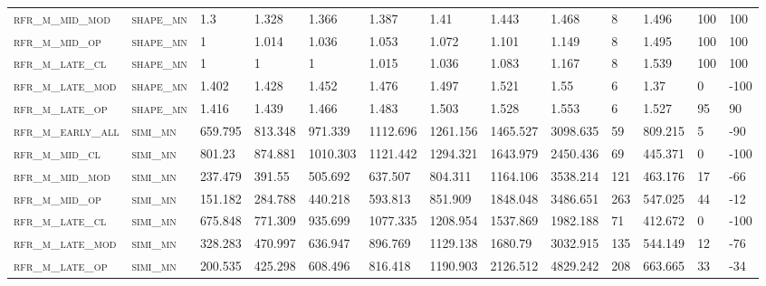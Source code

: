 \begin{landscape}
\begin{center}
\begin{footnotesize}
\begin{longtable}{lllllllllllll}
\textsc{rfr\_m\_mid\_mod  } & \textsc{shape\_mn }   & 1.3     & 1.328   & 1.366    & 1.387    & 1.41     & 1.443    & 1.468    & 8      & 1.496         & 100           & 100      \\
\textsc{rfr\_m\_mid\_op   } & \textsc{shape\_mn }   & 1       & 1.014   & 1.036    & 1.053    & 1.072    & 1.101    & 1.149    & 8      & 1.495         & 100           & 100      \\
\textsc{rfr\_m\_late\_cl  } & \textsc{shape\_mn }   & 1       & 1       & 1        & 1.015    & 1.036    & 1.083    & 1.167    & 8      & 1.539         & 100           & 100      \\
\textsc{rfr\_m\_late\_mod } & \textsc{shape\_mn }   & 1.402   & 1.428   & 1.452    & 1.476    & 1.497    & 1.521    & 1.55     & 6      & 1.37          & 0             & -100     \\
\textsc{rfr\_m\_late\_op  } & \textsc{shape\_mn }   & 1.416   & 1.439   & 1.466    & 1.483    & 1.503    & 1.528    & 1.553    & 6      & 1.527         & 95            & 90       \\
\textsc{rfr\_m\_early\_all} & \textsc{simi\_mn  }   & 659.795 & 813.348 & 971.339  & 1112.696 & 1261.156 & 1465.527 & 3098.635 & 59     & 809.215       & 5             & -90      \\
\textsc{rfr\_m\_mid\_cl   } & \textsc{simi\_mn  }   & 801.23  & 874.881 & 1010.303 & 1121.442 & 1294.321 & 1643.979 & 2450.436 & 69     & 445.371       & 0             & -100     \\
\textsc{rfr\_m\_mid\_mod  } & \textsc{simi\_mn  }   & 237.479 & 391.55  & 505.692  & 637.507  & 804.311  & 1164.106 & 3538.214 & 121    & 463.176       & 17            & -66      \\
\textsc{rfr\_m\_mid\_op   } & \textsc{simi\_mn  }   & 151.182 & 284.788 & 440.218  & 593.813  & 851.909  & 1848.048 & 3486.651 & 263    & 547.025       & 44            & -12      \\
\textsc{rfr\_m\_late\_cl  } & \textsc{simi\_mn  }   & 675.848 & 771.309 & 935.699  & 1077.335 & 1208.954 & 1537.869 & 1982.188 & 71     & 412.672       & 0             & -100     \\
\textsc{rfr\_m\_late\_mod } & \textsc{simi\_mn  }   & 328.283 & 470.997 & 636.947  & 896.769  & 1129.138 & 1680.79  & 3032.915 & 135    & 544.149       & 12            & -76      \\
\textsc{rfr\_m\_late\_op  } & \textsc{simi\_mn  }   & 200.535 & 425.298 & 608.496  & 816.418  & 1190.903 & 2126.512 & 4829.242 & 208    & 663.665       & 33            & -34      \\%


\end{longtable}
\end{footnotesize}
\end{center}
\end{landscape}

